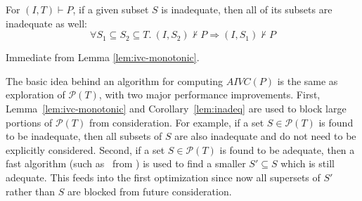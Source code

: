

\begin{corollary}
\label{lem:inadeq}
For $(I, T) \vdash P$, if a given subset $S$ is inadequate, then all of its subsets are inadequate as well:
\allowbreak $$\forall S_1 \subseteq S_2 \subseteq T.~ (I, S_2) \nvdash P \Rightarrow (I, S_1) \nvdash P$$
\end{corollary}
\begin{IEEEproof}
  Immediate from Lemma \ref{lem:ivc-monotonic}.
\end{IEEEproof}


The basic idea behind an algorithm for computing $AIVC(P)$ is the same
as exploration of $\mathcal{P}(T)$, with two major performance
improvements. First, Lemma~\ref{lem:ivc-monotonic} and
Corollary~\ref{lem:inadeq} are used to block large portions of
$\mathcal{P}(T)$ from consideration. For example, if a set $S \in
\mathcal{P}(T)$ is found to be inadequate, then all subsets of $S$ are
also inadequate and do not need to be explicitly considered. Second,
if a set $S \in \mathcal{P}(T)$ is found to be adequate, then a fast
algorithm (such as \ucalg\ from \cite{Ghass16}) is used to find a
smaller $S' \subseteq S$ which is still adequate. This feeds into the
first optimization since now all supersets of $S'$ rather than $S$ are
blocked from future consideration.

